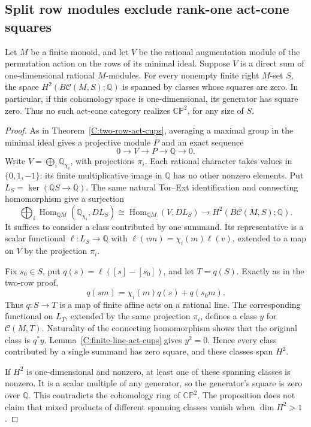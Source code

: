 \subsection{Split row modules exclude rank-one act-cone squares}

\begin{proposition}\label{C:split-row-act-cups}
Let $M$ be a finite monoid, and let $V$ be the rational augmentation
module of the permutation action on the rows of its minimal ideal.
Suppose $V$ is a direct sum of one-dimensional rational $M$-modules.
For every nonempty finite right $M$-set $S$, the space
$H^2(B\mathcal C(M,S);\mathbb Q)$ is spanned by classes whose
squares are zero.  In particular, if this cohomology space is
one-dimensional, its generator has square zero.  Thus no such
act-cone category realizes $\mathbb{CP}^2$, for any size of $S$.
\end{proposition}

\begin{proof}
As in Theorem~\ref{C:two-row-act-cups}, averaging a maximal group in
the minimal ideal gives a projective module $P$ and an exact sequence
\[
 0\longrightarrow V\longrightarrow P\longrightarrow\mathbb Q
                       \longrightarrow0.
\]
Write $V=\bigoplus_i\mathbb Q_{\chi_i}$, with projections $\pi_i$.
Each rational character takes values in $\{0,1,-1\}$: its finite
multiplicative image in $\mathbb Q$ has no other nonzero elements.
Put $L_S=\ker(\mathbb QS\to\mathbb Q)$.  The same natural
Tor--Ext identification and connecting homomorphism give a surjection
\[
 \bigoplus_i\operatorname{Hom}_{\mathbb QM}
       (\mathbb Q_{\chi_i},D L_S)
 \cong\operatorname{Hom}_{\mathbb QM}(V,D L_S)
 \longrightarrow H^2(B\mathcal C(M,S);\mathbb Q).
\]
It suffices to consider a class contributed by one summand.  Its
representative is a scalar functional $\ell:L_S\to\mathbb Q$
with $\ell(vm)=\chi_i(m)\ell(v)$, extended to a map on $V$ by
the projection $\pi_i$.

Fix $s_0\in S$, put $q(s)=\ell([s]-[s_0])$, and let $T=q(S)$.
Exactly as in the two-row proof,
\[
 q(sm)=\chi_i(m)q(s)+q(s_0m).
\]
Thus $q:S\to T$ is a map of finite affine acts on a rational line.
The corresponding functional on $L_T$, extended by the same
projection $\pi_i$, defines a class $y$ for $\mathcal C(M,T)$.
Naturality of the connecting homomorphism shows that the original
class is $q^*y$.  Lemma~\ref{C:finite-line-act-cups} gives $y^2=0$.
Hence every class contributed by a single summand has zero square,
and these classes span $H^2$.

If $H^2$ is one-dimensional and nonzero, at least one of these
spanning classes is nonzero.  It is a scalar multiple of any
generator, so the generator's square is zero over $\mathbb Q$.
This contradicts the cohomology ring of $\mathbb{CP}^2$.
The proposition does not claim that mixed products of different
spanning classes vanish when $\dim H^2>1$.
\end{proof}

